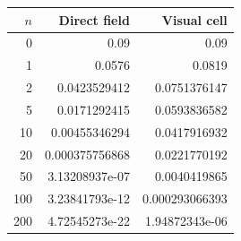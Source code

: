 \begin{tabular}{rrr}
\hline
$n$ & Direct field & Visual cell \\
\hline
0 & 0.09 & 0.09 \\
1 & 0.0576 & 0.0819 \\
2 & 0.0423529412 & 0.0751376147 \\
5 & 0.0171292415 & 0.0593836582 \\
10 & 0.00455346294 & 0.0417916932 \\
20 & 0.000375756868 & 0.0221770192 \\
50 & 3.13208937e-07 & 0.0040419865 \\
100 & 3.23841793e-12 & 0.000293066393 \\
200 & 4.72545273e-22 & 1.94872343e-06 \\
\hline
\end{tabular}
